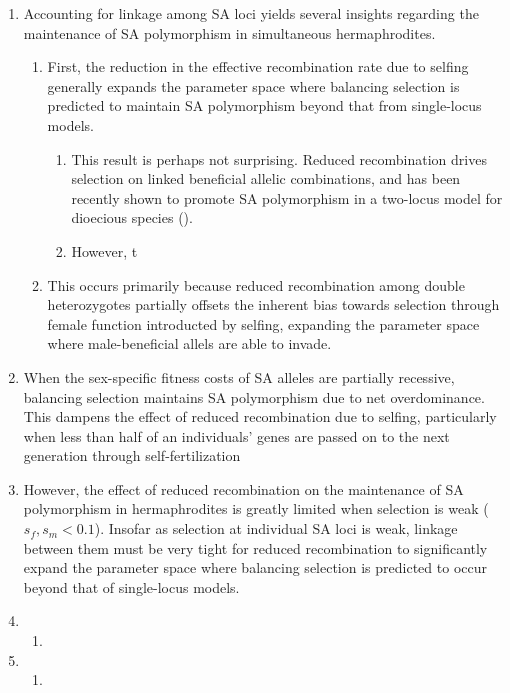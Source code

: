 \documentclass{article}
\begin{document}
\begin{enumerate}
	\item Accounting for linkage among SA loci yields several insights regarding the maintenance of SA polymorphism in simultaneous hermaphrodites. 
	\begin{enumerate}
		\item First, the reduction in the effective recombination rate due to selfing generally expands the parameter space where balancing selection is predicted to maintain SA polymorphism beyond that from single-locus models. 
		\begin{enumerate}
			\item This result is perhaps not surprising. Reduced recombination drives selection on linked beneficial allelic combinations, and has been recently shown to promote SA polymorphism in a two-locus model for dioecious species (\citealt{Patten2010}).
			\item However, t
		\end{enumerate}
		\item This occurs primarily because reduced recombination among double heterozygotes partially offsets the inherent bias towards selection through female function introducted by selfing, expanding the parameter space where male-beneficial allels are able to invade.
	\end{enumerate}
		\item When the sex-specific fitness costs of SA alleles are partially recessive, balancing selection maintains SA polymorphism due to net overdominance. This dampens the effect of reduced recombination due to selfing, particularly when less than half of an individuals' genes are passed on to the next generation through self-fertilization
	\item However, the effect of reduced recombination on the maintenance of SA polymorphism in hermaphrodites is greatly limited when selection is weak ($s_f,s_m < 0.1$). Insofar as selection at individual SA loci is weak, linkage between them must be very tight for reduced recombination to significantly expand the parameter space where balancing selection is predicted to occur beyond that of single-locus models.
	\item 
	\begin{enumerate}
		\item 
	\end{enumerate}
	\item  
	\begin{enumerate}
		\item 
	\end{enumerate}
\end{enumerate}
\end{document}

